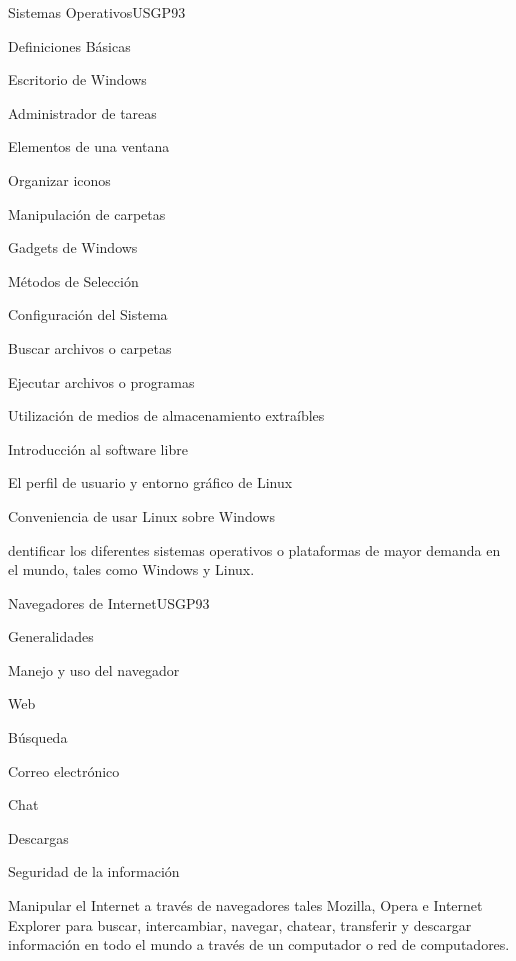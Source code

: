 \begin{syllabus}
\begin{unit}{Sistemas Operativos}{USGP}{9}{3}
\begin{topics}
      \item Definiciones Básicas
      \item Escritorio de Windows
      \item Administrador de tareas
      \item Elementos de una ventana
      \item Organizar iconos
      \item Manipulación de carpetas
      \item Gadgets de Windows 
      \item Métodos de Selección
      \item Configuración del Sistema
      \item Buscar archivos o carpetas
      \item Ejecutar archivos o programas
      \item Utilización de medios de almacenamiento extraíbles
      \item Introducción al software libre
      \item El perfil de usuario y entorno gráfico de Linux
      \item Conveniencia de usar Linux sobre Windows
\end{topics}
\begin{unitgoals}
   \item dentificar los diferentes sistemas operativos o plataformas de mayor demanda en el mundo, tales como Windows y Linux.
\end{unitgoals}
\end{unit}

\begin{unit}{Navegadores de Internet}{USGP}{9}{3}
\begin{topics}
      \item Generalidades
      \item Manejo y uso del navegador
      \item Web
      \item Búsqueda
      \item Correo electrónico
      \item Chat
      \item Descargas
      \item Seguridad de la información
\end{topics}
\begin{unitgoals}
   \item Manipular el Internet a través de navegadores tales Mozilla, Opera e Internet Explorer para buscar, intercambiar, navegar, chatear, transferir y descargar información en todo el mundo a través de un computador o red de computadores.
\end{unitgoals}
\end{unit}


\end{syllabus}
